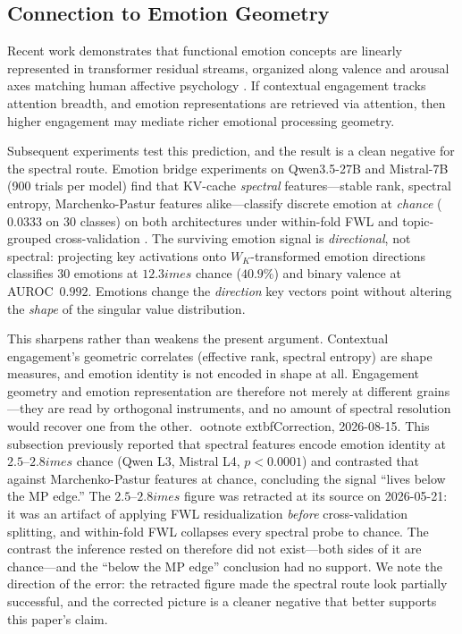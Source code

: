 \documentclass[11pt,a4paper]{article}
\begin{document}
\subsection{Connection to Emotion Geometry}

Recent work demonstrates that functional emotion concepts are linearly represented in transformer residual streams, organized along valence and arousal axes matching human affective psychology \citep{anthropic2026emotions}. If contextual engagement tracks attention breadth, and emotion representations are retrieved via attention, then higher engagement may mediate richer emotional processing geometry.

Subsequent experiments test this prediction, and the result is a clean negative for the spectral route. Emotion bridge experiments on Qwen3.5-27B and Mistral-7B (900 trials per model) find that KV-cache \emph{spectral} features---stable rank, spectral entropy, Marchenko-Pastur features alike---classify discrete emotion at \emph{chance} ($0.0333$ on 30 classes) on both architectures under within-fold FWL and topic-grouped cross-validation \citep{lyra2026usermodel}. The surviving emotion signal is \emph{directional}, not spectral: projecting key activations onto $W_K$-transformed emotion directions classifies 30 emotions at $12.3	imes$ chance ($40.9\%$) and binary valence at AUROC~$0.992$. Emotions change the \emph{direction} key vectors point without altering the \emph{shape} of the singular value distribution.

This sharpens rather than weakens the present argument. Contextual engagement's geometric correlates (effective rank, spectral entropy) are shape measures, and emotion identity is not encoded in shape at all. Engagement geometry and emotion representation are therefore not merely at different grains---they are read by orthogonal instruments, and no amount of spectral resolution would recover one from the other.%
ootnote{	extbf{Correction, 2026-08-15.} This subsection previously reported that spectral features encode emotion identity at $2.5$--$2.8	imes$ chance (Qwen L3, Mistral L4, $p<0.0001$) and contrasted that against Marchenko-Pastur features at chance, concluding the signal ``lives below the MP edge.'' The $2.5$--$2.8	imes$ figure was retracted at its source on 2026-05-21: it was an artifact of applying FWL residualization \emph{before} cross-validation splitting, and within-fold FWL collapses every spectral probe to chance. The contrast the inference rested on therefore did not exist---both sides of it are chance---and the ``below the MP edge'' conclusion had no support. We note the direction of the error: the retracted figure made the spectral route look partially successful, and the corrected picture is a cleaner negative that better supports this paper's claim.}
\end{document}
